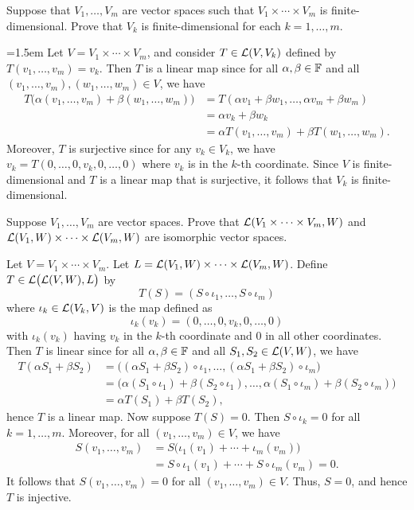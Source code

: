 \begin{exc}
\begin{exercise}
Suppose that $V_1,\dots,V_m$ are vector spaces such that
$V_1\times\cdots\times V_m$ is finite-dimensional. Prove that $V_k$ is
finite-dimensional for each $k=1,\dots,m$.
\end{exercise}
\begin{solution}\emergencystretch=1.5em
Let $V=V_1\times\cdots\times V_m$, and consider $T\in\mathcal{L}(V,V_k)$ defined by
$T(v_1,\dots,v_m)=v_k$. Then $T$ is a linear map since for all
$\alpha,\beta\in\mathbb{F}$ and all $(v_1,\dots,v_m),(w_1,\dots,w_m)\in V$, we have
\begin{align*}
T\bigl(\alpha(v_1,\dots,v_m)+\beta(w_1,\dots,w_m)\bigr)
  &= T(\alpha v_1+\beta w_1,\dots,\alpha v_m+\beta w_m)\\
  &= \alpha v_k+\beta w_k\\
  &= \alpha T(v_1,\dots,v_m)+\beta T(w_1,\dots,w_m).
\end{align*}
Moreover, $T$ is surjective since for any $v_k\in V_k$, we have
$v_k=T(0,\dots,0,v_k,0,\dots,0)$ where $v_k$ is in the $k$-th coordinate. Since
$V$ is finite-dimensional and $T$ is a linear map that is surjective, it follows
that $V_k$ is finite-dimensional.
\end{solution}

\begin{exercise}
Suppose $V_1,\dots,V_m$ are vector spaces. Prove that
$\mathcal{L}(V_1\times\cdots\times V_m,W)$ and
$\mathcal{L}(V_1,W)\times\cdots\times\mathcal{L}(V_m,W)$ are isomorphic vector spaces.
\end{exercise}
\begin{solution}
Let $V=V_1\times\cdots\times V_m$. Let
$L=\mathcal{L}(V_1,W)\times\cdots\times\mathcal{L}(V_m,W)$. Define
$T\in\mathcal{L}\bigl(\mathcal{L}(V,W),L\bigr)$ by
\[ T(S) = (S\circ\iota_1,\dots,S\circ\iota_m) \]
where $\iota_k\in\mathcal{L}(V_k,V)$ is the map defined as
\[ \iota_k(v_k) = (0,\dots,0,v_k,0,\dots,0) \]
with $\iota_k(v_k)$ having $v_k$ in the $k$-th coordinate and $0$ in all other
coordinates. Then $T$ is linear since for all $\alpha,\beta\in\mathbb{F}$ and all
$S_1,S_2\in\mathcal{L}(V,W)$, we have
\begin{align*}
T(\alpha S_1+\beta S_2)
  &= \bigl((\alpha S_1+\beta S_2)\circ\iota_1,\dots,
     (\alpha S_1+\beta S_2)\circ\iota_m\bigr)\\
  &= \bigl(\alpha(S_1\circ\iota_1)+\beta(S_2\circ\iota_1),\dots,
     \alpha(S_1\circ\iota_m)+\beta(S_2\circ\iota_m)\bigr)\\
  &= \alpha T(S_1)+\beta T(S_2),
\end{align*}
hence $T$ is a linear map. Now suppose $T(S)=0$. Then $S\circ\iota_k=0$ for all
$k=1,\dots,m$. Moreover, for all $(v_1,\dots,v_m)\in V$, we have
\begin{align*}
S(v_1,\dots,v_m) &= S\bigl(\iota_1(v_1)+\cdots+\iota_m(v_m)\bigr)\\
  &= S\circ\iota_1(v_1)+\cdots+S\circ\iota_m(v_m) = 0.
\end{align*}
It follows that $S(v_1,\dots,v_m)=0$ for all $(v_1,\dots,v_m)\in V$. Thus,
$S=0$, and hence $T$ is injective.


\end{solution}
\end{exc}
